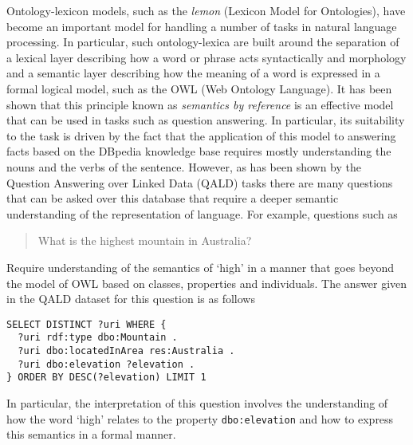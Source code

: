 \documentclass[11pt]{article}
\begin{document}
Ontology-lexicon models, such as the \emph{lemon} (Lexicon Model for Ontologies)\cite{mccrae2012interchanging}, have become an important model for handling a number of tasks in natural language processing. In particular, such ontology-lexica are built around the separation of a lexical layer describing how a word or phrase acts syntactically and morphology and a semantic layer describing how the meaning of a word is expressed in a formal logical model, such as the OWL (Web Ontology Language)\cite{}. It has been shown that this principle known as \emph{semantics by reference}\cite{} is an effective model that can be used in tasks such as question answering\cite{}. In particular, its suitability to the task is driven by the fact that the application of this model to answering facts based on the DBpedia\cite{} knowledge base requires mostly understanding the nouns and the verbs of the sentence. However, as has been shown by the Question Answering over Linked Data (QALD)\cite{} tasks there are many questions that can be asked over this database that require a deeper semantic understanding of the representation of language. For example, questions such as 

\begin{quote}
What is the highest mountain in Australia?
\end{quote}

Require understanding of the semantics of `high' in a manner that goes beyond the model of OWL based on classes, properties and individuals. The answer given in the QALD dataset for this question is as follows

\begin{verbatim}
SELECT DISTINCT ?uri WHERE { 
  ?uri rdf:type dbo:Mountain . 
  ?uri dbo:locatedInArea res:Australia . 
  ?uri dbo:elevation ?elevation . 
} ORDER BY DESC(?elevation) LIMIT 1
\end{verbatim}

In particular, the interpretation of this question involves the understanding of how the word `high' relates to the property {\tt dbo:elevation} and how to express this semantics in a formal manner.
\end{document}
